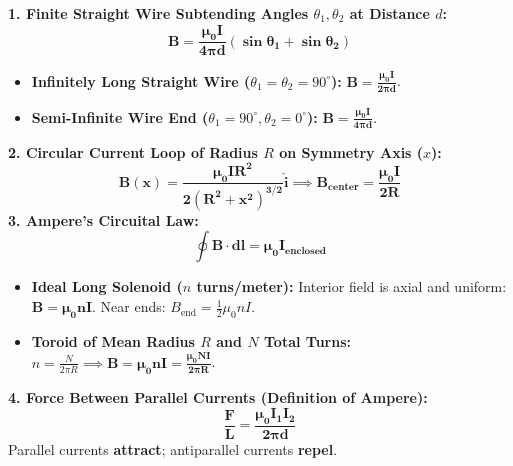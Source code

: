 \documentclass[10pt,twoside,openright]{book}
\begin{document}
\begin{formulabox}
\textbf{1. Finite Straight Wire Subtending Angles $\theta_1, \theta_2$ at Distance $d$:}
\begin{equation}
  \mathbf{B = \frac{\mu_0 I}{4\pi d}(\sin\theta_1 + \sin\theta_2)}
\end{equation}
\begin{itemize}
  \item \textbf{Infinitely Long Straight Wire ($\theta_1 = \theta_2 = 90^\circ$):} $\mathbf{B = \frac{\mu_0 I}{2\pi d}}$.
  \item \textbf{Semi-Infinite Wire End ($\theta_1 = 90^\circ, \theta_2 = 0^\circ$):} $\mathbf{B = \frac{\mu_0 I}{4\pi d}}$.
\end{itemize}
\textbf{2. Circular Current Loop of Radius $R$ on Symmetry Axis ($x$):}
\begin{equation}
  \mathbf{B(x) = \frac{\mu_0 I R^2}{2(R^2 + x^2)^{3/2}} \hat{\mathbf{i}}} \implies \mathbf{B_{\text{center}} = \frac{\mu_0 I}{2R}}
\end{equation}
\textbf{3. Ampere's Circuital Law:}
\begin{equation}
  \mathbf{\oint \mathbf{B}\cdot d\mathbf{l} = \mu_0 I_{\text{enclosed}}}
\end{equation}
\begin{itemize}
  \item \textbf{Ideal Long Solenoid ($n$ turns/meter):} Interior field is axial and uniform: $\mathbf{B = \mu_0 n I}$. Near ends: $B_{\text{end}} = \frac{1}{2}\mu_0 n I$.
  \item \textbf{Toroid of Mean Radius $R$ and $N$ Total Turns:} $n = \frac{N}{2\pi R} \implies \mathbf{B = \mu_0 n I = \frac{\mu_0 N I}{2\pi R}}$.
\end{itemize}
\textbf{4. Force Between Parallel Currents (Definition of Ampere):}
\begin{equation}
  \mathbf{\frac{F}{L} = \frac{\mu_0 I_1 I_2}{2\pi d}}
\end{equation}
Parallel currents \textbf{attract}; antiparallel currents \textbf{repel}.
\end{formulabox}
\end{document}
